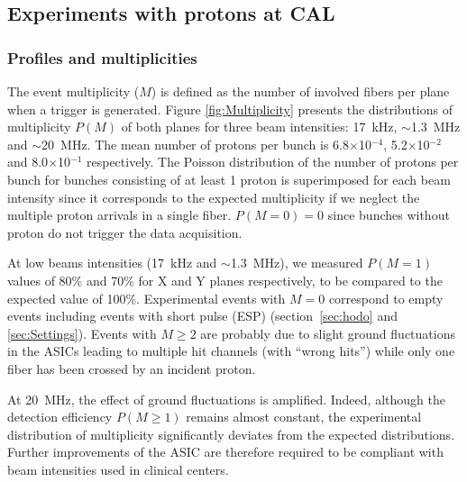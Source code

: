 \documentclass[a4paper,11pt]{article}
\begin{document}
\subsection{Experiments with protons at CAL}
\subsubsection{Profiles and multiplicities}
\label{Profiles_And_Multiplies}

The event multiplicity ($M$) is defined as the number of involved fibers per plane when a trigger is generated. Figure \ref{fig:Multiplicity} presents the distributions of multiplicity $P(M)$ of both planes for three beam intensities: 17~kHz, $\sim$1.3~MHz and $\sim$20~MHz. The mean number of protons per bunch is 6.8$\times$10$^{-4}$, 5.2$\times$10$^{-2}$ and 8.0$\times$10$^{-1}$ respectively. The Poisson distribution of the number of protons per bunch for bunches consisting of at least 1 proton is superimposed for each beam intensity since it corresponds to the expected multiplicity if we neglect the multiple proton arrivals in a single fiber. $P(M=0)=0$ since bunches without proton do not trigger the data acquisition. 

At low beams intensities (17~kHz and $\sim$1.3~MHz), we measured $P(M=1)$ values of 80\% and 70\% for X and Y planes respectively, to be compared to the expected value of 100\%. Experimental events with $M=0$ correspond to empty events including events with short pulse (ESP) (section~\ref{sec:hodo} and \ref{sec:Settings}). Events with $M\ge2$ are probably due to slight ground fluctuations in the ASICs leading to multiple hit channels (with \enquote{wrong hits}) while only one fiber has been crossed by an incident proton. 

At 20~MHz, the effect of ground fluctuations is amplified. Indeed, although the detection efficiency $P(M\ge1)$ remains almost constant, the experimental distribution of multiplicity significantly deviates from the expected distributions. Further improvements of the ASIC are therefore required to be compliant with beam intensities used in clinical centers.
\end{document}
